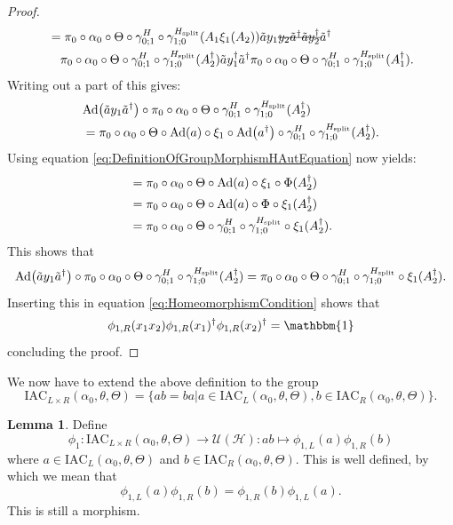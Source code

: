 \documentclass[12pt,a4paper,twoside]{article}
\newcommand{\stkout}[1]{\ifmmode\text{\sout{\ensuremath{#1}}}\else\sout{#1}\fi}
\newcommand{\IAC}{\textrm{IAC}}
\let\originalleft\left
\let\originalright\right
\renewcommand{\left}{\mathopen{}\mathclose\bgroup\originalleft}
\renewcommand{\right}{\aftergroup\egroup\originalright}
\newcommand{\UU}{\mathcal U}
\newcommand{\HH}{\mathcal H}
\newcommand{\id}{\mathbbm{1}}
\newcommand{\Ad}[1]{\textrm{Ad}\left(#1\right)}
\theoremstyle{definition}
\newtheorem{lemma}[theorem]{Lemma}
\numberwithin{equation}{section}
\begin{document}
\begin{proof}
\begin{align}
		\label{eq:HomeomorphismCondition}
		&=\pi_0\circ\alpha_0\circ\Theta\circ\gamma^H_{0;1}\circ\gamma^{H_\text{split}}_{1;0}(A_1\xi_1(A_2))\tilde{a}y_1\stkout{y_2\tilde{a}^\dagger \tilde{a}y_2^\dagger}\tilde{a}^\dagger\\
		\nonumber
		&\quad\pi_0\circ\alpha_0\circ\Theta\circ\gamma^H_{0;1}\circ\gamma^{H_\text{split}}_{1;0}(A_2^\dagger)\tilde{a}y_1^\dagger\tilde{a}^\dagger \pi_0\circ\alpha_0\circ\Theta\circ\gamma^H_{0;1}\circ\gamma^{H_\text{split}}_{1;0}(A_1^\dagger).
	\end{align}
	Writing out a part of this gives:
	\begin{align}
		&\Ad{\tilde{a}y_1\tilde{a}^\dagger}\circ\pi_0\circ\alpha_0\circ\Theta\circ\gamma^H_{0;1}\circ\gamma^{H_\text{split}}_{1;0}(A_2^\dagger)\\
		&=\pi_0\circ\alpha_0\circ\Theta\circ\Ad{a}\circ\xi_1\circ\Ad{a^\dagger}\circ\gamma^H_{0;1}\circ\gamma^{H_\text{split}}_{1;0}(A_2^\dagger).
	\end{align}
	Using equation \eqref{eq:DefinitionOfGroupMorphismHAutEquation} now yields:
	\begin{align}
		&=\pi_0\circ\alpha_0\circ\Theta\circ\Ad{a}\circ\xi_1\circ\Phi(A_2^\dagger)\\
		&=\pi_0\circ\alpha_0\circ\Theta\circ\Ad{a}\circ\Phi\circ\xi_1(A_2^\dagger)\\
		&=\pi_0\circ\alpha_0\circ\Theta\circ\gamma^H_{0;1}\circ\gamma^{H_\text{split}}_{1;0}\circ\xi_1(A_2^\dagger).
	\end{align}
	This shows that
	\begin{equation}
		\Ad{\tilde{a}y_1\tilde{a}^\dagger}\circ\pi_0\circ\alpha_0\circ\Theta\circ\gamma^H_{0;1}\circ\gamma^{H_\text{split}}_{1;0}(A_2^\dagger)=\pi_0\circ\alpha_0\circ\Theta\circ\gamma^H_{0;1}\circ\gamma^{H_\text{split}}_{1;0}\circ\xi_1(A_2^\dagger).
	\end{equation}
	Inserting this in equation \eqref{eq:HomeomorphismCondition} shows that
	\begin{equation}
		\phi_{1,R}(x_1x_2)\phi_{1,R}(x_1)^\dagger\phi_{1,R}(x_2)^\dagger=\id
	\end{equation}
	concluding the proof.
\end{proof}
We now have to extend the above definition to the group
\begin{equation}
	\IAC_{L\times R}(\alpha_0,\theta,\Theta)=\{ab=ba|a\in\IAC_{L}(\alpha_0,\theta,\Theta),b\in\IAC_{R}(\alpha_0,\theta,\Theta)\}.
\end{equation}
\begin{lemma}\label{lem:extensionOfPhi1Definition}
	Define
	\begin{equation}
		\phi_1:\IAC_{L\times R}(\alpha_0,\theta,\Theta)\rightarrow\UU(\HH):ab\mapsto \phi_{1,L}(a)\phi_{1,R}(b)
	\end{equation}
	where $a\in \IAC_{L}(\alpha_0,\theta,\Theta)$ and $b\in \IAC_{R}(\alpha_0,\theta,\Theta)$. This is well defined, by which we mean that
	\begin{equation}
		\phi_{1,L}(a)\phi_{1,R}(b)=\phi_{1,R}(b)\phi_{1,L}(a).
	\end{equation}
	This is still a morphism.
\end{lemma}
\end{document}
